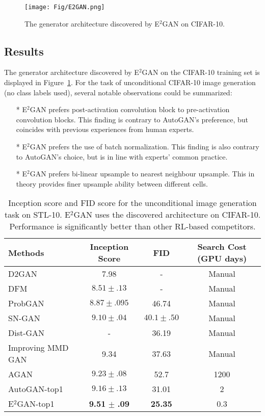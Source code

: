 \documentclass[runningheads]{llncs}
\begin{document}
\begin{figure}[ht!bp]
    \centering
\texttt{[image: Fig/E2GAN.png]}
    \caption{The generator architecture discovered by E$^2$GAN on CIFAR-10.}
    \label{fig:E$^2$GAN}
\end{figure}
\subsection{Results}
The generator architecture discovered by E$^2$GAN on the CIFAR-10 training set is displayed in Figure~\ref{fig:E$^2$GAN}. For the task of unconditional CIFAR-10 image generation (no class labels used), several notable observations could be summarized:

\begin{itemize}
\item[*] E$^2$GAN prefers post-activation convolution block to pre-activation convolution blocks. This finding is contrary to AutoGAN's preference, but coincides with previous experiences from human experts.
\item[*] E$^2$GAN prefers the use of batch normalization. This finding is also contrary to AutoGAN's choice, but is in line with experts' common practice. 
\item[*] E$^2$GAN prefers bi-linear upsample to nearest neighbour upsample. This in theory provides finer upsample ability between different cells. 
\end{itemize}




\begin{table}[b!]
\begin{center}
\begin{tabular}{l|c|c|c}
Methods&Inception Score&FID&Search Cost (GPU days)\\
\hline
D2GAN~\cite{nguyen2017dual}& 7.98&-& Manual\\
DFM~\cite{warde2016improving}&$8.51 \pm .13$&-&Manual\\
ProbGAN~\cite{he2019probgan}& $8.87 \pm .095$&46.74 &Manual \\
SN-GAN~\cite{miyato2018spectral}&  $9.10 \pm .04 $&$40.1 \pm .50$&Manual\\
Dist-GAN~\cite{tran2018dist}&- &36.19&Manual\\
Improving MMD GAN~\cite{wang2018improving}  & 9.34&37.63&Manual\\\hline
AGAN~\cite{wang2019agan}&$9.23 \pm .08$&52.7&1200\\
AutoGAN-top1~\cite{gong2019autogan}&  $9.16\pm .13 $ &31.01&2\\
\hline
E$^2$GAN-top1 & \textbf{9.51} $\pm $ \textbf{.09} &\textbf{25.35} &0.3\\

\end{tabular}
\end{center}
\caption{Inception score and FID score for the unconditional image generation task on STL-10. E$^2$GAN  uses the discovered architecture on CIFAR-10. Performance is significantly better than other RL-based competitors.}
\label{rstl}
\end{table}
\end{document}
